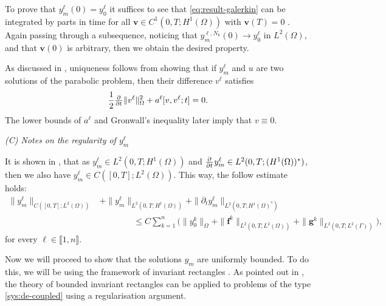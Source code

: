 \documentclass[11pt]{article}
\newcommand{\llb}{\llbracket}
\newcommand{\rrb}{\rrbracket}
\newcommand{\bv}{\mathbf{v}}
\numberwithin{equation}{section}
\begin{document}
	To prove that \(  y_m^\ell (0) = y_0^\ell\) it suffices to see that \eqref{eq:result-galerkin} can be integrated by parts in time for all \( \bv \in C^1(0,T;H^1(\Omega))\) with \(\bv(T) = 0\) \cite{Evans-2010}. Again passing through a subsequence, noticing that \(  y_m^{\ell, N_k} (0) \to y_0^\ell\) in \(L^2(\Omega)\), and that \(\bv(0)\) is arbitrary, then we obtain the desired property.
	
	As discussed in \cite{Evans-2010}, uniqueness follows from showing that if \(  y_m^\ell\) and \( u\) are two solutions of the parabolic problem, then their difference \(v^\ell\) satisfies
	\[
		\frac{1}{2}
		\pd{ }{t} \| v^\ell \|^2_{\Omega} + 
		a^\ell [v, v^\ell; t]
		=
		0.
	\]
	The lower bounds of \(a^\ell\) and Gronwall's inequality later imply that \( v \equiv 0\).
















\vspace{1\baselineskip}
\noindent\emph{(C) Notes on the regularity of \(y_m^\ell\)}
\vspace{0.5\baselineskip}


It is shown in \cite{Evans-2010}, that as \(y_m^\ell \in L^2(0,T; H^1(\Omega)) \) and \(\pd{ }{t} y_m^\ell \in L^2(0,T; (H^1(\Omega))^*) \), then we also have  \(y_m^\ell \in C([0,T]; L^2 (\Omega))\). This way, the follow estimate holds:
	\begin{equation}
	\begin{aligned}
		\|  y_m^{\ell} \|_{C([0,T];L^2(\Omega) )} 
		&+ \| y_m^{\ell} \|_{L^2(0,T; H^1(\Omega))}
		+  \| \partial_t  y_m^{\ell} \|_{L^2(0,T;H^1(\Omega)^*)}
		\\
		&\qquad\qquad\leq 
		C\sum_{k=1}^n \bigg(  \|  y_0^k \|_\Omega + \|\mathbf{f}^k\|_{L^2(0,T;L^2(\Omega))} + \|\mathbf{g}^k\|_{L^2(0,T; L^2(\Gamma))} \bigg),
	\end{aligned}
	\end{equation}
	for every \( \ell \in \llb 1, n\rrb\).



Now we will proceed to show that the solutions \(y_m\) are uniformly bounded.  To do this, we will be using the framework of invariant rectangles \cite{Redlinger-1989,Weinberger-1975}. As pointed out in \cite{Ptashnyk-2016}, the theory of bounded invariant rectangles can be applied to problems of the type \eqref{sys:de-coupled} using a regularisation argument. 
\end{document}
